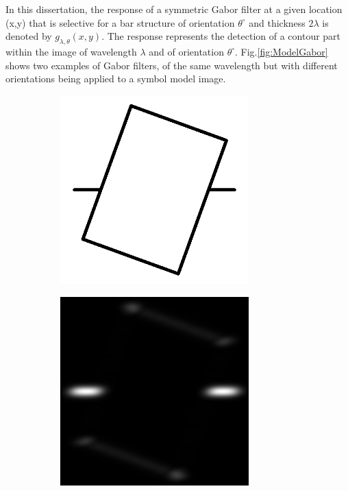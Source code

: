 In this dissertation, the response of a symmetric Gabor filter at a given location (x,y) that is selective for a bar structure of orientation $\theta^{\circ}$ and thickness $2\lambda$ is denoted by $g_{\lambda,\theta}(x,y)$. The response represents the detection of a contour part within the image of wavelength $\lambda$ and of orientation $\theta^{\circ}$. Fig.\ref{fig:ModelGabor} shows two examples of Gabor filters, of the same wavelength but with different orientations being applied to a symbol model image. \\

\begin{figure}[h]
        \centering
        \begin{subfigure}[b]{0.3\textwidth}
                \centering
                \includegraphics[width=0.8\textwidth]{figures/Method/ModelSymbol1.png}
                \caption{}
                \label{fig:examplesymbol2}
        \end{subfigure}
        \begin{subfigure}[b]{0.3\textwidth}
                \centering
                \includegraphics[width=0.8\textwidth]{figures/Method/gabor_15_95.png}

\end{subfigure}
\end{figure}
